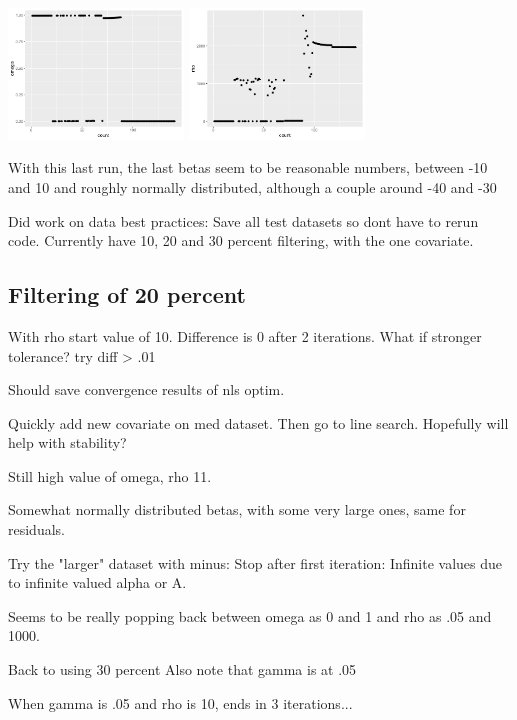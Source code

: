 \documentclass[10pt]{article}
\theoremstyle{definition}
\begin{document}
	\includegraphics[width=0.35\textwidth]{img/Spring_2022_Journal-b16835c7.png}
	\includegraphics[width=0.35\textwidth]{img/Spring_2022_Journal-504ae687.png}


With this last run, the last betas seem to be reasonable numbers, between -10 and 10 and roughly normally distributed, although a couple around -40 and -30

Did work on data best practices: Save all test datasets so dont have to rerun code. Currently have 10, 20 and 30 percent filtering, with the one covariate.


\subsection{Filtering of 20 percent}

With rho start value of 10. Difference is 0 after 2 iterations.
What if stronger tolerance? try diff > .01


Should save convergence results of nls optim.

Quickly add new covariate on med dataset. Then go to line search. Hopefully will help with stability?

Still high value of omega, rho 11.

Somewhat normally distributed betas, with some very large ones, same for residuals.

Try the "larger" dataset with minus:
Stop after first iteration: Infinite values due to infinite valued alpha or A.

Seems to be really popping back between omega as 0 and 1 and rho as .05 and 1000.

Back to using 30 percent
Also note that gamma is at .05

When gamma is .05 and rho is 10, ends in 3 iterations...
\end{document}
